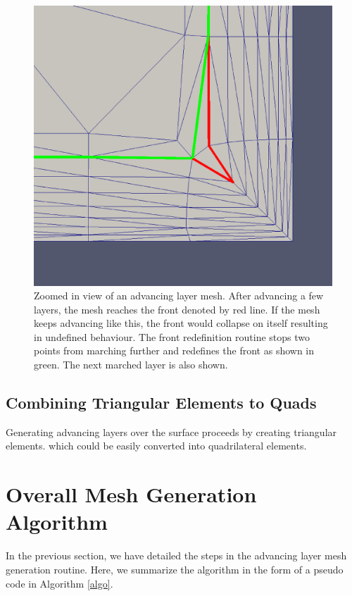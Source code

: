 \documentclass[conf]{new-aiaa}
\begin{document}
\begin{figure}[hbt!]
    \centering
    \includegraphics[width=.5\textwidth]{front-before-n-after-redefinition.eps}
    \caption{Zoomed in view of an advancing layer mesh. After advancing a few layers, the mesh reaches the front denoted by red line. If the mesh keeps advancing like this, the front would collapse on itself resulting in undefined behaviour. The front redefinition routine stops two points from marching further and redefines the front as shown in green. The next marched layer is also shown.}
    \label{front-redef}
\end{figure}

\subsection{Combining Triangular Elements to Quads}

Generating advancing layers over the surface proceeds by creating triangular elements. which could be easily converted into quadrilateral elements.

\section{Overall Mesh Generation Algorithm}

In the previous section, we have detailed the steps in the advancing layer mesh generation routine. Here, we summarize the algorithm in the form of a pseudo code in Algorithm \ref{algo}.
\end{document}
